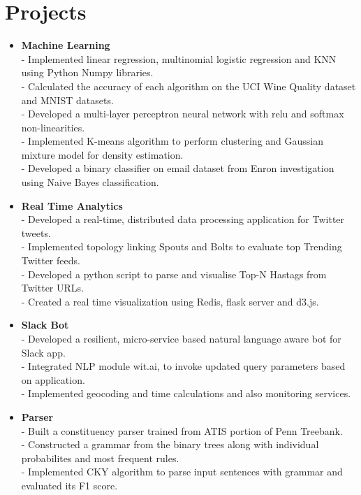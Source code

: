\section {Projects}
\begin{itemize}


 \item \textbf{Machine Learning} \\
 - Implemented linear regression, multinomial logistic regression and KNN using Python Numpy libraries. \\
 - Calculated the accuracy of each algorithm on the UCI Wine Quality dataset and MNIST datasets.\\
 - Developed a multi-layer perceptron neural network with relu and softmax non-linearities. \\
 - Implemented K-means algorithm to perform clustering and Gaussian mixture model for density estimation.\\
 - Developed a binary classifier on email dataset from Enron investigation using Naive Bayes classification.

\item \textbf{Real Time Analytics} \\
 - Developed a real-time, distributed data processing application for Twitter tweets.\\
 - Implemented topology linking Spouts and Bolts to evaluate top Trending Twitter feeds. \\
 - Developed a python script to parse and visualise Top-N Hastags from Twitter URLs.\\
 - Created a real time visualization using Redis, flask server and d3.js.
 
 \item \textbf{Slack Bot} \\
 - Developed a resilient, micro-service based natural language aware bot for Slack app.\\
 - Integrated NLP module wit.ai, to invoke updated query parameters based on application.\\
 - Implemented geocoding and time calculations and also monitoring services. 

  \item \textbf{Parser} \\
 - Built a constituency parser trained from ATIS portion of Penn Treebank.\\
 - Constructed a grammar from the binary trees along with individual probabilites and most frequent rules. \\
 - Implemented CKY algorithm to parse input sentences with grammar and evaluated its F1 score.


\end{itemize}
